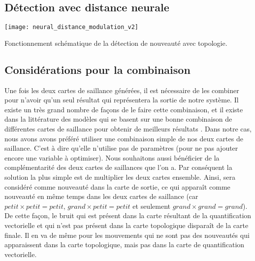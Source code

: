 	\subsection{Détection avec distance neurale}

	\begin{figureth}
		\texttt{[image: neural\_distance\_modulation\_v2]}
		\caption[Détection de nouveauté avec topologie]{Fonctionnement schématique de la détection de nouveauté avec topologie.}\label{fig:img:topo}
	\end{figureth}

	

	\subsection{Considérations pour la combinaison}
	
	Une fois les deux cartes de saillance générées, il est nécessaire de les combiner pour n'avoir qu'un seul résultat qui représentera la sortie de notre système. Il existe un très grand nombre de façons de le faire cette combinaison, et il existe dans la littérature des modèles qui se basent sur une bonne combinaison de différentes cartes de saillance pour obtenir de meilleurs résultats \nocite{todo}. Dans notre cas, nous avons avons préféré utiliser une combinaison simple de nos deux cartes de saillance. C'est à dire qu'elle n'utilise pas de paramètres (pour ne pas ajouter encore une variable à optimiser). Nous souhaitons aussi bénéficier de la complémentarité des deux cartes de saillances que l'on a. Par conséquent la solution la plus simple est de multiplier les deux cartes ensemble. Ainsi, sera considéré comme nouveauté dans la carte de sortie, ce qui apparaît comme nouveauté en même temps dans les deux cartes de saillance (car $\textit{petit} \times \textit{petit} = \textit{petit}$, $\textit{grand} \times \textit{petit} = \textit{petit}$ et seulement $\textit{grand} \times \textit{grand} = \textit{grand}$). De cette façon, le bruit qui est présent dans la carte résultant de la quantification vectorielle et qui n'est pas présent dans la carte topologique disparaît de la carte finale. Il en va de même pour les mouvements qui ne sont pas des nouveautés qui apparaissent dans la carte topologique, mais pas dans la carte de quantification vectorielle.

